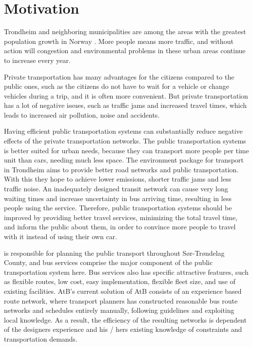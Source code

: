 \section{Motivation} 

Trondheim and neighboring municipalities are among the areas with the greatest population growth in Norway \citep{website:miljopakken}. More people means more traffic, and without action will congestion and environmental problems in these urban areas continue to increase every year. 

Private transportation has many advantages for the citizens compared to the public ones, such as the citizens do not have to wait for a vehicle or change vehicles during a trip, and it is often more convenient. But private transportation has a lot of negative issues, such as traffic jams and increased travel times, which leads to increased air pollution, noise and accidents. 
 
Having efficient public transportation systems can substantially reduce negative effects of the private transportation networks. The public transportation systems is better suited for urban needs, because they can transport more people per time unit than cars, needing much less space. The environment package \citep{website:miljopakken} for transport in Trondheim aims to provide better road networks and public transportation. With this they hope to achieve lower emissions, shorter traffic jams and less traffic noise. An inadequately designed transit network can cause very long waiting times and increase uncertainty in bus arriving time, resulting in less people using the service. Therefore, public transportation systems should be improved by providing better travel services, minimizing the total travel time, and inform the public about them, in order to convince more people to travel with it instead of using their own car.

\citet{website:atb} is responsible for planning the public transport throughout Sør-Trøndelag County, and bus services comprise the major component of the public transportation system here. Bus services also has specific attractive features, such as flexible routes, low cost, easy implementation, flexible fleet size, and use of existing facilities. 
AtB's current solution of AtB consists of an experience based route network, where transport planners has constructed reasonable bus route networks and schedules entirely manually, following guidelines and exploiting local knowledge. As a result, the efficiency of the resulting networks is dependent of the designers experience and his / hers existing knowledge of constraints and transportation demands. 

